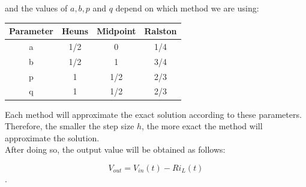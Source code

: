 \documentclass[10pt,a4paper]{article}
\begin{document}
and the values of $a, b, p$ and $q$ depend on which method we are using:

\begin{center}
 \begin{tabular}{||c | c c c||} 
 \hline
 Parameter & Heuns & Midpoint & Ralston \\ [0.5ex] 
 \hline\hline
 a & 1/2 & 0 & 1/4 \\ 
 \hline
 b & 1/2 & 1 & 3/4 \\
 \hline
 p & 1 & 1/2 & 2/3 \\
 \hline
 q & 1 & 1/2 & 2/3 \\ [1ex] 
 \hline
\end{tabular}
\end{center}

Each method will approximate the exact solution according to these parameters. Therefore, the smaller the step size $h$, the more exact the method will approximate the solution.\\

 After doing so, the output value will be obtained as follows: 

\[V_{out} = V_{in}(t) - R i_L(t)\]. \\
\end{document}
